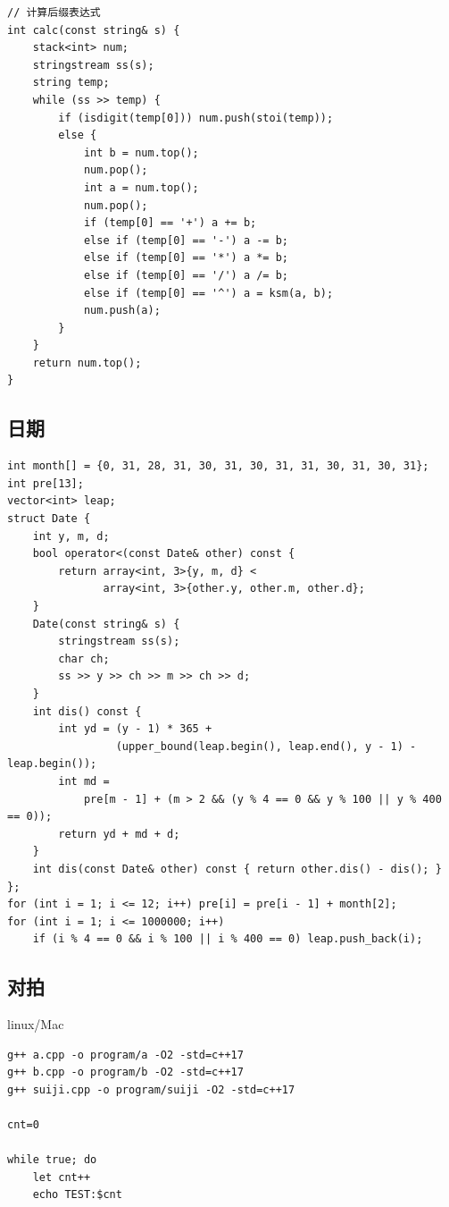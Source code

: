 \documentclass[UTF8]{ctexart}
\begin{document}
\begin{sloppypar}
\begin{lstlisting}[style=cpp]
// 计算后缀表达式
int calc(const string& s) {
    stack<int> num;
    stringstream ss(s);
    string temp;
    while (ss >> temp) {
        if (isdigit(temp[0])) num.push(stoi(temp));
        else {
            int b = num.top();
            num.pop();
            int a = num.top();
            num.pop();
            if (temp[0] == '+') a += b;
            else if (temp[0] == '-') a -= b;
            else if (temp[0] == '*') a *= b;
            else if (temp[0] == '/') a /= b;
            else if (temp[0] == '^') a = ksm(a, b);
            num.push(a);
        }
    }
    return num.top();
}
\end{lstlisting}

\subsection{日期}

\begin{lstlisting}[style=cpp]
int month[] = {0, 31, 28, 31, 30, 31, 30, 31, 31, 30, 31, 30, 31};
int pre[13];
vector<int> leap;
struct Date {
    int y, m, d;
    bool operator<(const Date& other) const {
        return array<int, 3>{y, m, d} <
               array<int, 3>{other.y, other.m, other.d};
    }
    Date(const string& s) {
        stringstream ss(s);
        char ch;
        ss >> y >> ch >> m >> ch >> d;
    }
    int dis() const {
        int yd = (y - 1) * 365 +
                 (upper_bound(leap.begin(), leap.end(), y - 1) - leap.begin());
        int md =
            pre[m - 1] + (m > 2 && (y % 4 == 0 && y % 100 || y % 400 == 0));
        return yd + md + d;
    }
    int dis(const Date& other) const { return other.dis() - dis(); }
};
for (int i = 1; i <= 12; i++) pre[i] = pre[i - 1] + month[2];
for (int i = 1; i <= 1000000; i++)
    if (i % 4 == 0 && i % 100 || i % 400 == 0) leap.push_back(i);
\end{lstlisting}

\subsection{对拍}

linux/Mac

\begin{lstlisting}[style=cpp]
g++ a.cpp -o program/a -O2 -std=c++17
g++ b.cpp -o program/b -O2 -std=c++17
g++ suiji.cpp -o program/suiji -O2 -std=c++17

cnt=0

while true; do
    let cnt++
    echo TEST:$cnt


\end{lstlisting}
\end{sloppypar}
\end{document}
